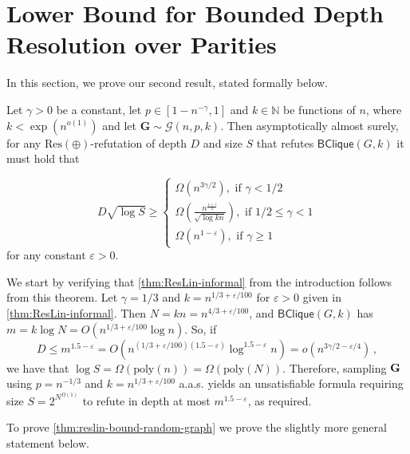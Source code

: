 \documentclass[10pt,a4paper]{article}
\makeatletter
\theoremstyle{definition}
\theoremstyle{remark}
\theoremstyle{example}
\theoremstyle{plain}
\newcommand{\calG}{\mathcal{G}}
\newcommand{\Gbf}{\bm{G}}
\newcommand{\ResLin}{\textrm{Res}(\oplus)}
\newcommand{\binClique}[2]{\mathsf{BClique}({#1}, {#2})}
\newcommand{\binCliqueGk}{\binClique{G}{k}}
\newcommand{\aas}{a.a.s.\@\xspace}
\makeatother
\begin{document}
\section{Lower Bound for Bounded Depth Resolution over Parities}
\label{sec:binCliqueResLin}


In this section, we prove our second result, stated formally below.



\begin{theorem}
    \label{thm:reslin-bound-random-graph}
    Let $\gamma>0$ be a constant, let $p\in [1-n^{-\gamma},1]$ and $k \in\mathbb{N}$  be functions of $n$, where $k < \exp(n^{o(1)})$ and let $\Gbf\sim \calG(n,p,k)$. Then asymptotically almost surely, for any $\ResLin$-refutation of depth $D$ and size $S$ that refutes $\binCliqueGk$ it must hold that
    
    \begin{equation*}
    D\sqrt{\log S}\geq
        \begin{cases}
            \Omega(n^{3\gamma/2}), \text{ if } \gamma < 1/2\\
            \Omega(\frac{n^{\frac{1+\gamma}{2}}}{\sqrt{\log kn}}), \text{ if } 1/2\leq \gamma < 1\\
            \Omega(n^{1-\varepsilon}), \text{ if } \gamma \ge 1 
        \end{cases}
    \end{equation*}
    for any constant $\varepsilon > 0$.
\end{theorem}
We start by verifying that \autoref{thm:ResLin-informal} from the introduction follows from this theorem. Let $\gamma= 1/3$ and $k=n^{1/3+\varepsilon/100}$ for $\varepsilon>0$ given in \autoref{thm:ResLin-informal}.
    Then $N=kn=n^{4/3+\varepsilon/100}$, and $\binCliqueGk$ has $m= k\log N = 
    O(n^{1/3+\varepsilon/100}\log n)$. 
    So, if 
    \begin{equation*}
    D\leq m^{1.5-\varepsilon}=O(n^{(1/3+\varepsilon/100)(1.5-\varepsilon)}\log^{1.5-\varepsilon} n)=o(n^{3\gamma/2-\varepsilon/4})\,,
    \end{equation*}
    we have that $\log S= \Omega(\textrm{poly}(n))=\Omega(\textrm{poly}(N))$. Therefore, sampling $\bf G$ using $p=n^{-1/3}$ and $k=n^{1/3+\varepsilon/100}$  \aas yields an unsatisfiable formula requiring size $S= 2^{N^{\Omega(1)}}$ to refute in depth at most $m^{1.5-\varepsilon}$, as required.

To prove \autoref{thm:reslin-bound-random-graph} we prove the slightly more general statement below. 
 
\end{document}

